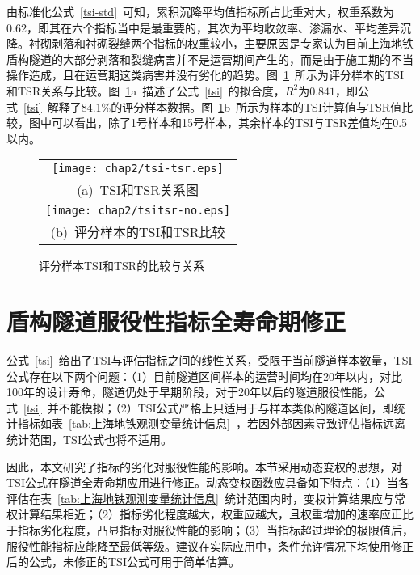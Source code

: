 由标准化公式~\ref{tsi-std}~可知，累积沉降平均值指标所占比重对大，权重系数为0.62，即其在六个指标当中是最重要的，其次为平均收敛率、渗漏水、平均差异沉降。衬砌剥落和衬砌裂缝两个指标的权重较小，主要原因是专家认为目前上海地铁盾构隧道的大部分剥落和裂缝病害并不是运营期间产生的，而是由于施工期的不当操作造成，且在运营期这类病害并没有劣化的趋势。图~\ref{fig:TSI和TSR的比较与关系}~所示为评分样本的TSI和TSR关系与比较。图~\ref{fig:TSI和TSR的比较与关系}a~描述了公式~\ref{tsi}~的拟合度，$R^2$为$0.841$，即公式~\ref{tsi}~解释了84.1\%的评分样本数据。图~\ref{fig:TSI和TSR的比较与关系}b~所示为样本的TSI计算值与TSR值比较，图中可以看出，除了1号样本和15号样本，其余样本的TSI与TSR差值均在0.5以内。

\begin{figure}[htb!] 
    \centering 
    \begin{tabular}{c} 
        \texttt{[image: chap2/tsi-tsr.eps]} \\ 
        (a)~TSI和TSR关系图 \\
        \texttt{[image: chap2/tsitsr-no.eps]} \\ 
        (b)~评分样本的TSI和TSR比较 \\
    \end{tabular}
    \caption{评分样本TSI和TSR的比较与关系} 
    \label{fig:TSI和TSR的比较与关系} 
\end{figure}

\section{盾构隧道服役性指标全寿命期修正}

公式~\ref{tsi}~给出了TSI与评估指标之间的线性关系，受限于当前隧道样本数量，TSI公式存在以下两个问题：（1）目前隧道区间样本的运营时间均在20年以内，对比100年的设计寿命，隧道仍处于早期阶段，对于20年以后的隧道服役性能，公式~\ref{tsi}~并不能模拟；（2）TSI公式严格上只适用于与样本类似的隧道区间，即统计指标如表~\ref{tab:上海地铁观测变量统计信息}~，若因外部因素导致评估指标远离统计范围，TSI公式也将不适用。

因此，本文研究了指标的劣化对服役性能的影响。本节采用动态变权的思想，对TSI公式在隧道全寿命期应用进行修正。动态变权函数应具备如下特点：（1）当各评估在表~\ref{tab:上海地铁观测变量统计信息}~统计范围内时，变权计算结果应与常权计算结果相近；（2）指标劣化程度越大，权重应越大，且权重增加的速率应正比于指标劣化程度，凸显指标对服役性能的影响；（3）当指标超过理论的极限值后，服役性能指标应能降至最低等级。建议在实际应用中，条件允许情况下均使用修正后的公式，未修正的TSI公式可用于简单估算。

